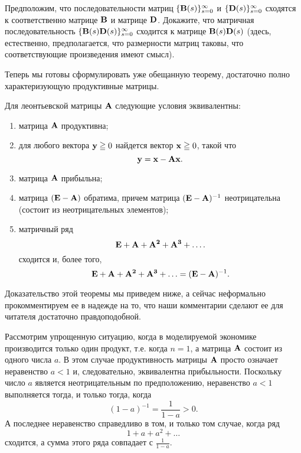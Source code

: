 \begin{exer} \label{predel-proizverd}
    Предположим, что последовательности матриц
    $\{\mathbf{B}(s)\}_{s=0}^{\infty}$ и $\{\mathbf{D}(s)\}_{s=0}^{\infty}$
    сходятся к соответственно матрице $\mathbf{B}$ и матрице $\mathbf{D}$.
    Докажите, что матричная последовательность
    $\{\mathbf{B}(s)\mathbf{D}(s)\}_{s=0}^{\infty}$ сходится к матрице
    $\mathbf{B}(s)\mathbf{D}(s)$ (здесь, естественно, предполагается, что
    размерности матриц таковы, что соответствующие произведения имеют
    смысл).
\end{exer}






    Теперь мы готовы сформулировать уже обещанную теорему,
    достаточно полно характеризующую продуктивные матрицы.

\begin{teo}
\label{Teor-Leontief}
    Для леонтьевской матрицы  $\mathbf{A}$ следующие условия эквивалентны:
\begin{enumerate}[1)]
    \item
    матрица $\mathbf{A}$ продуктивна;
    \item
    для любого вектора $\mathbf{y}\geqq0$ найдется вектор
    $\mathbf{x}\geqq0$, такой что
\begin{equation}
\label{Leontief-uravn}
    \mathbf{y}=\mathbf{x}-\mathbf{A}\mathbf{x}.
\end{equation}
    \item
    матрица $\mathbf{A}$ прибыльна;
    \item
    матрица $(\mathbf{E}-\mathbf{A})$ обратима, причем матрица
    $(\mathbf{E}-\mathbf{A})^{-1}$ неотрицательна (состоит из неотрицательных
    элементов);
    \item
    матричный ряд
\begin{equation} \label{Leontief-riad}
    \mathbf{E}+\mathbf{A}+\mathbf{A^{2}}+\mathbf{A^{3}}+\ldots.
\end{equation}
    сходится и, более того,
    \begin{equation} \label{Leontief-summa-riada}
    \mathbf{E}+\mathbf{A}+\mathbf{A^{2}}+\mathbf{A^{3}}+\ldots =(\mathbf{E}-\mathbf{A})^{-1}.
\end{equation}
    \end{enumerate}
\end{teo}

    Доказательство этой теоремы мы приведем ниже, а сейчас
    неформально прокомментируем ее в надежде на то, что наши
    комментарии сделают ее для читателя достаточно правдоподобной.

    Рассмотрим упрощенную ситуацию, когда в моделируемой экономике
    производится только один продукт, т.е. когда $n=1$, а
     матрица $\mathbf{A}$ состоит из одного числа $a$. В этом случае
     продуктивность матрицы $\mathbf{A}$ просто означает неравенство
     $a<1$ и, следовательно, эквивалентна прибыльности. Поскольку число $a$ является
     неотрицательным по предположению, неравенство $a<1$ выполняется
     тогда, и только тогда, когда
     \[(1-a)^{-1}=\frac{1}{1-a}>0.\]
    А последнее неравенство справедливо в том, и только том случае,
    когда ряд
    \[1+a+a^{2}+\ldots\]
    сходится, а сумма этого ряда совпадает с $\frac{1}{1-a}$.

